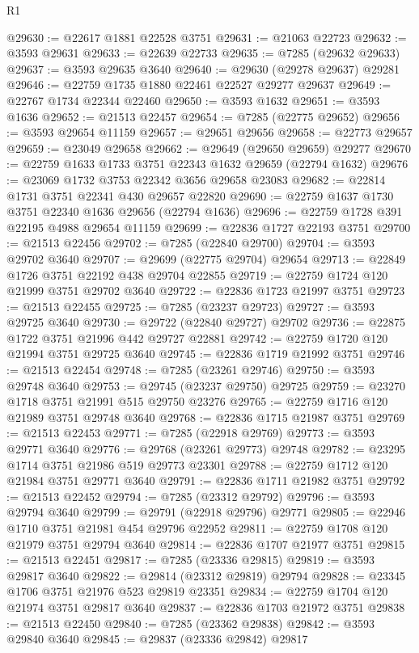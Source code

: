 \begin{lexlean}{R1}
\begin{coremodule}
@29630 := @22617 @1881 @22528 @3751
@29631 := @21063 @22723
@29632 := @3593 @29631
@29633 := @22639 @22733
@29635 := @7285 (@29632 @29633)
@29637 := @3593 @29635 @3640
@29640 := @29630 (@29278 @29637) @29281
@29646 := @22759 @1735 @1880 @22461 @22527 @29277 @29637
@29649 := @22767 @1734 @22344 @22460
@29650 := @3593 @1632
@29651 := @3593 @1636
@29652 := @21513 @22457
@29654 := @7285 (@22775 @29652)
@29656 := @3593 @29654 @11159
@29657 := @29651 @29656
@29658 := @22773 @29657
@29659 := @23049 @29658
@29662 := @29649 (@29650 @29659) @29277
@29670 := @22759 @1633 @1733 @3751 @22343 @1632 @29659 (@22794 @1632)
@29676 := @23069 @1732 @3753 @22342 @3656 @29658 @23083
@29682 := @22814 @1731 @3751 @22341 @430 @29657 @22820
@29690 := @22759 @1637 @1730 @3751 @22340 @1636 @29656 (@22794 @1636)
@29696 := @22759 @1728 @391 @22195 @4988 @29654 @11159
@29699 := @22836 @1727 @22193 @3751
@29700 := @21513 @22456
@29702 := @7285 (@22840 @29700)
@29704 := @3593 @29702 @3640
@29707 := @29699 (@22775 @29704) @29654
@29713 := @22849 @1726 @3751 @22192 @438 @29704 @22855
@29719 := @22759 @1724 @120 @21999 @3751 @29702 @3640
@29722 := @22836 @1723 @21997 @3751
@29723 := @21513 @22455
@29725 := @7285 (@23237 @29723)
@29727 := @3593 @29725 @3640
@29730 := @29722 (@22840 @29727) @29702
@29736 := @22875 @1722 @3751 @21996 @442 @29727 @22881
@29742 := @22759 @1720 @120 @21994 @3751 @29725 @3640
@29745 := @22836 @1719 @21992 @3751
@29746 := @21513 @22454
@29748 := @7285 (@23261 @29746)
@29750 := @3593 @29748 @3640
@29753 := @29745 (@23237 @29750) @29725
@29759 := @23270 @1718 @3751 @21991 @515 @29750 @23276
@29765 := @22759 @1716 @120 @21989 @3751 @29748 @3640
@29768 := @22836 @1715 @21987 @3751
@29769 := @21513 @22453
@29771 := @7285 (@22918 @29769)
@29773 := @3593 @29771 @3640
@29776 := @29768 (@23261 @29773) @29748
@29782 := @23295 @1714 @3751 @21986 @519 @29773 @23301
@29788 := @22759 @1712 @120 @21984 @3751 @29771 @3640
@29791 := @22836 @1711 @21982 @3751
@29792 := @21513 @22452
@29794 := @7285 (@23312 @29792)
@29796 := @3593 @29794 @3640
@29799 := @29791 (@22918 @29796) @29771
@29805 := @22946 @1710 @3751 @21981 @454 @29796 @22952
@29811 := @22759 @1708 @120 @21979 @3751 @29794 @3640
@29814 := @22836 @1707 @21977 @3751
@29815 := @21513 @22451
@29817 := @7285 (@23336 @29815)
@29819 := @3593 @29817 @3640
@29822 := @29814 (@23312 @29819) @29794
@29828 := @23345 @1706 @3751 @21976 @523 @29819 @23351
@29834 := @22759 @1704 @120 @21974 @3751 @29817 @3640
@29837 := @22836 @1703 @21972 @3751
@29838 := @21513 @22450
@29840 := @7285 (@23362 @29838)
@29842 := @3593 @29840 @3640
@29845 := @29837 (@23336 @29842) @29817

\end{coremodule}
\end{lexlean}
